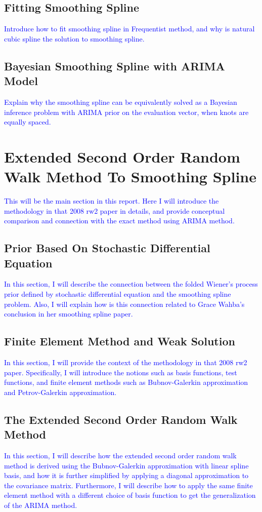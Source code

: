 \documentclass{article}
\newcommand{\ziang}{\textcolor{blue}}
\begin{document}
\subsection{Fitting Smoothing Spline}
\ziang{Introduce how to fit smoothing spline in Frequentist method, and why is natural cubic spline the solution to smoothing spline.}
\subsection{Bayesian Smoothing Spline with ARIMA Model}
\ziang{Explain why the smoothing spline can be equivalently solved as a Bayesian inference problem with ARIMA prior on the evaluation vector, when knots are equally spaced.}
\section{Extended Second Order Random Walk Method To Smoothing Spline}
\ziang{This will be the main section in this report. Here I will introduce the methodology in that 2008 rw2 paper in details, and provide conceptual comparison and connection with the exact method using ARIMA method.}
\subsection{Prior Based On Stochastic Differential Equation}
\ziang{In this section, I will describe the connection between the folded Wiener's process prior defined by stochastic differential equation and the smoothing spline problem. Also, I will explain how is this connection related to Grace Wahba's conclusion in her smoothing spline paper.}
\subsection{Finite Element Method and Weak Solution}
\ziang{In this section, I will provide the context of the methodology in that 2008 rw2 paper. Specifically, I will introduce the notions such as basis functions, test functions, and finite element methods such as Bubnov-Galerkin approximation and Petrov-Galerkin approximation.}
\subsection{The Extended Second Order Random Walk Method}
\ziang{In this section, I will describe how the extended second order random walk method is derived using the Bubnov-Galerkin approximation with linear spline basis, and how it is further simplified by applying a diagonal approximation to the covariance matrix. Furthermore, I will describe how to apply the same finite element method with a different choice of basis function to get the generalization of the ARIMA method.}
\end{document}
